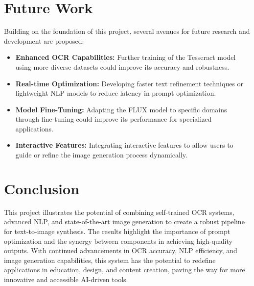 \section{Future Work}
Building on the foundation of this project, several avenues for future research and development are proposed:
\begin{itemize}
    \item \textbf{Enhanced OCR Capabilities:} Further training of the Tesseract model using more diverse datasets could improve its accuracy and robustness.
    \item \textbf{Real-time Optimization:} Developing faster text refinement techniques or lightweight NLP models to reduce latency in prompt optimization.
    \item \textbf{Model Fine-Tuning:} Adapting the FLUX model to specific domains through fine-tuning could improve its performance for specialized applications.
    \item \textbf{Interactive Features:} Integrating interactive features to allow users to guide or refine the image generation process dynamically.
    \end{itemize}

\section{Conclusion}
This project illustrates the potential of combining self-trained OCR systems, advanced NLP, and state-of-the-art image generation to create a robust pipeline for text-to-image synthesis. The results highlight the importance of prompt optimization and the synergy between components in achieving high-quality outputs. With continued advancements in OCR accuracy, NLP efficiency, and image generation capabilities, this system has the potential to redefine applications in education, design, and content creation, paving the way for more innovative and accessible AI-driven tools.